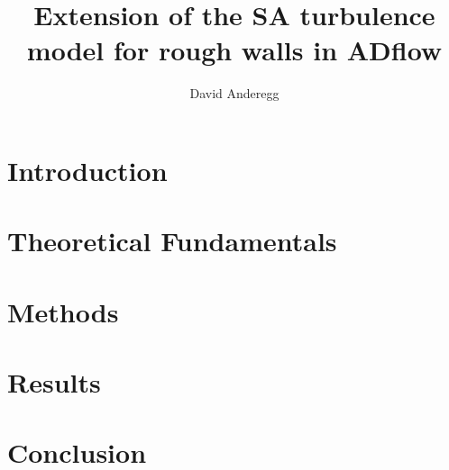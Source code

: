 \documentclass[a4paper, 10pt]{report}
\title{Extension of the SA turbulence model for rough walls in ADflow}
\author{David Anderegg}
\begin{document}




    \chapter{Introduction}
    

    \chapter{Theoretical Fundamentals}
    

    \chapter{Methods}
    


    \chapter{Results}
    


    \chapter{Conclusion}
    

    \printbibliography
\end{document}
